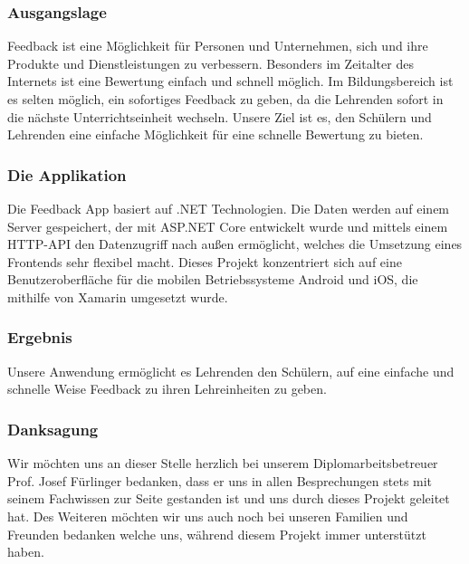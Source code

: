 \subsubsection{Ausgangslage}
Feedback ist eine Möglichkeit für Personen und Unternehmen, sich und ihre Produkte und Dienstleistungen zu verbessern. 
Besonders im Zeitalter des Internets ist eine Bewertung einfach und schnell möglich. Im Bildungsbereich ist es selten möglich, ein sofortiges Feedback zu geben, 
da die Lehrenden sofort in die nächste Unterrichtseinheit wechseln.
Unsere Ziel ist es, den Schülern und Lehrenden eine einfache Möglichkeit für eine schnelle Bewertung zu bieten.

\subsubsection{Die Applikation}
Die Feedback App basiert auf .NET Technologien. Die Daten werden auf einem Server gespeichert, 
der mit ASP.NET Core entwickelt wurde und mittels einem HTTP-API den Datenzugriff nach außen ermöglicht, welches 
die Umsetzung eines Frontends sehr flexibel macht. Dieses Projekt konzentriert sich auf eine Benutzeroberfläche für die 
mobilen Betriebssysteme Android und iOS, die mithilfe von Xamarin umgesetzt wurde.

\subsubsection{Ergebnis}
Unsere Anwendung ermöglicht es Lehrenden den Schülern, auf eine einfache und schnelle Weise Feedback zu ihren Lehreinheiten zu geben.

\newpage
\subsubsection{Danksagung}
Wir möchten uns an dieser Stelle herzlich bei unserem Diplomarbeitsbetreuer Prof. Josef Fürlinger bedanken, 
dass er uns in allen Besprechungen stets mit seinem Fachwissen zur Seite gestanden ist und uns durch dieses Projekt geleitet hat.
Des Weiteren möchten wir uns auch noch bei unseren Familien und Freunden bedanken welche uns, während diesem Projekt immer unterstützt haben.

